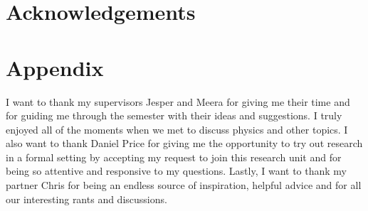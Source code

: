 \documentclass[10pt, a4paper, singlespacing, headsepline]{article}
\begin{document}
\section{Acknowledgements}

\section{Appendix}
I want to thank my supervisors Jesper and Meera for giving me their time and for guiding me through the semester with their ideas and suggestions. I truly enjoyed all of the moments when we met to discuss physics and other topics. I also want to thank Daniel Price for giving me the opportunity to try out research in a formal setting by accepting my request to join this research unit and for being so attentive and responsive to my questions. Lastly, I want to thank my partner Chris for being an endless source of inspiration, helpful advice and for all our interesting rants and discussions. 






\end{document}
